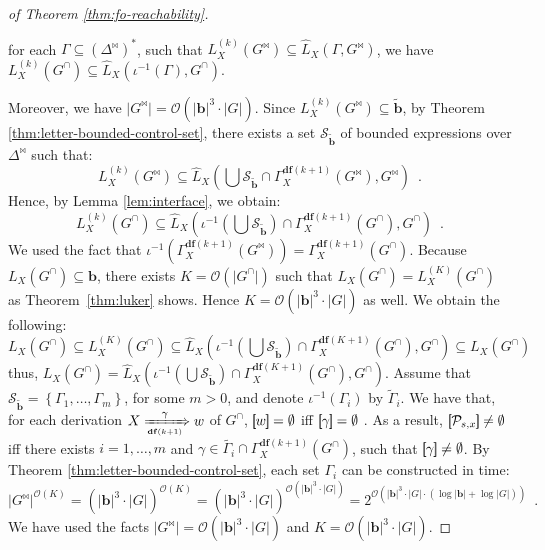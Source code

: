 \documentclass[final]{llncs}
\newcommand{\rbr}{{\bf ]\!\!]}}
\newcommand{\lbr}{{\bf [\!\![}}
\newcommand{\sem}[1]{\lbr #1 \rbr}
\def\set#1{{\left\{ #1 \right\}}}
\def\len#1{{\vert{#1}\vert}}
\def\prod{\Delta}
\def\pat{{\mathbf{b}}}
\def\patt{{\widetilde{\mathbf{b}}}}
\def\df#1{\scriptscriptstyle\mathbf{df}(#1)}
\begin{document}
\begin{proof}[of Theorem \ref{thm:fo-reachability}]
\begin{compactenum}
  \item for each \(\Gamma \subseteq \left(\prod^\bowtie\right)^*\),
  such that \(L_X^{(k)}(G^\bowtie) \subseteq \hat{L}_X(\Gamma,
  G^\bowtie)\), we
  have \(L_X^{(k)}(G^\cap) \subseteq \hat{L}_X(\iota^{-1}(\Gamma),
  G^\cap)\).  \end{compactenum} Moreover, we have \(\len{G^\bowtie}
  = \mathcal{O}(\len{\pat}^3 \cdot \len{G})\).
  Since \(L_X^{(k)}(G^{\bowtie}) \subseteq \patt\), by
  Theorem \ref{thm:letter-bounded-control-set}, there exists a
  set \(\mathcal{S}_\patt\) of bounded expressions
  over \(\prod^\bowtie\) such
  that: \[L_X^{(k)}(G^\bowtie) \subseteq \hat{L}_X\left(\bigcup\mathcal{S}_\patt \cap \Gamma_X^{\df{k+1}}(G^\bowtie),
  G^\bowtie\right)\enspace.\] Hence, by Lemma \ref{lem:interface}, we
  obtain: \[L_X^{(k)}(G^\cap) \subseteq \hat{L}_X\left(\iota^{-1}\left(\bigcup\mathcal{S}_\patt\right) \cap \Gamma_X^{\df{k+1}}(G^\cap),
  G^\cap\right)\enspace.\] We used the fact
  that \(\iota^{-1}(\Gamma_X^{\df{k+1}}(G^\bowtie))
  = \Gamma_X^{\df{k+1}}(G^\cap)\).
  Because \(L_X(G^\cap) \subseteq \pat\), there
  exists \(K=\mathcal{O}(\len{G^\cap})\) such that \(L_X(G^\cap) =
  L_X^{(K)}(G^\cap)\) as Theorem~\ref{thm:luker} shows.
  Hence \(K=\mathcal{O}(\len{\pat}^3 \cdot \len{G})\) as well. We
  obtain the following: \[L_X(G^\cap) \subseteq
  L_X^{(K)}(G^\cap) \subseteq \hat{L}_X\left(\iota^{-1}\left(\bigcup\mathcal{S}_\patt\right) \cap \Gamma_X^{\df{K+1}}(G^\cap),
  G^\cap\right) \subseteq L_X(G^\cap)\] thus, \(L_X(G^\cap)
  = \hat{L}_X\left(\iota^{-1}\left(\bigcup\mathcal{S}_\patt\right) \cap \Gamma_X^{\df{K+1}}(G^\cap),
  G^\cap\right)\). Assume that \(\mathcal{S}_\patt
  = \set{\Gamma_1, \ldots, \Gamma_m}\), for some \(m>0\), and
  denote \(\iota^{-1}(\Gamma_i)\) by \(\widetilde{\Gamma}_i\). We have
  that, for each derivation \(X \xRightarrow[\df{k+1}]{\gamma} w\)
  of \(G^\cap\), \(\sem{w}=\emptyset\)
  if{}f \(\sem{\gamma}=\emptyset\) \cite[Lemma 2]{gik13}.  As a
  result, \(\sem{\mathcal{P}_{s,x}} \neq \emptyset\) if{}f there
  exists \(i=1,\ldots,m\)
  and \(\gamma \in \widetilde{\Gamma_i} \cap \Gamma_X^{\df{k+1}}(G^\cap)\),
  such that \(\sem{\gamma}\neq\emptyset\). By
  Theorem \ref{thm:letter-bounded-control-set}, each set \(\Gamma_i\)
  can be constructed in time: \[\len{G^\bowtie}^{\mathcal{O}(K)} =
  (\len{\pat}^3 \cdot \len{G})^{\mathcal{O}(K)} =
  (\len{\pat}^3 \cdot \len{G})^{\mathcal{O}(\len{\pat}^3 \cdot \len{G})}
  = 2^{\mathcal{O}(\len{\pat}^3 \cdot \len{G} \cdot (\log \len{\pat}
  + \log \len{G}))}\enspace.\] We have used the
  facts \(\len{G^\bowtie} = \mathcal{O}(\len{\pat}^3 \cdot \len{G})\)
  and \(K = \mathcal{O}(\len{\pat}^3 \cdot \len{G})\).


\end{proof}
\end{document}
